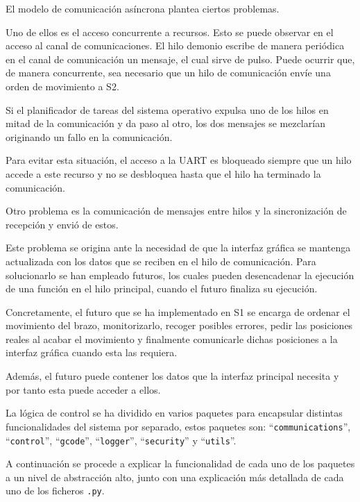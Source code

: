 El modelo de comunicación asíncrona plantea ciertos problemas.

Uno de ellos es el acceso concurrente a recursos. Esto se puede observar en el acceso al canal de comunicaciones. El hilo demonio escribe de manera periódica en el canal de comunicación un mensaje, el cual sirve de pulso. Puede ocurrir que, de manera concurrente, sea necesario que un hilo de comunicación envíe una orden de movimiento a \ac{S2}.

Si el planificador de tareas del sistema operativo expulsa uno de los hilos en mitad de la comunicación y da paso al otro, los dos mensajes se mezclarían originando un fallo en la comunicación. 

Para evitar esta situación, el acceso a la UART es bloqueado siempre que un hilo accede a este recurso y no se desbloquea hasta que el hilo ha terminado la comunicación.

Otro problema es la comunicación de mensajes entre hilos y la sincronización de recepción y envió de estos. 

Este problema se origina ante la necesidad de que la interfaz gráfica se mantenga actualizada con los datos que se reciben en el hilo de comunicación. Para solucionarlo se han empleado futuros, los cuales pueden desencadenar la ejecución de una función en el hilo principal, cuando el futuro finaliza su ejecución.

Concretamente, el futuro que se ha implementado en \ac{S1} se encarga de ordenar el movimiento del brazo, monitorizarlo, recoger posibles errores, pedir las posiciones reales al acabar el movimiento y finalmente comunicarle dichas posiciones a la interfaz gráfica cuando esta las requiera.

Además, el futuro puede contener los datos que la interfaz principal necesita y por tanto esta puede acceder a ellos.


La lógica de control se ha dividido en varios paquetes para encapsular distintas funcionalidades del sistema por separado, estos paquetes son: ``\texttt{communications}'', ``\texttt{control}'', ``\texttt{gcode}'', ``\texttt{logger}'', ``\texttt{security}'' y ``\texttt{utils}''.

A continuación se procede a explicar la funcionalidad de cada uno de los paquetes a un nivel de abstracción alto, junto con una explicación más detallada de cada uno de los ficheros \texttt{.py}.

